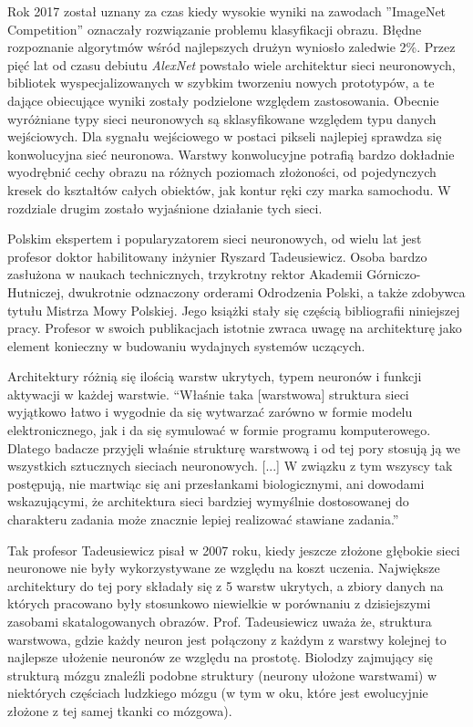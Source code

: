 \documentclass[12pt,a4paper,twoside,titlepage,openright]{book}
\begin{document}
Rok 2017 został uznany za czas kiedy wysokie wyniki na zawodach ''ImageNet Competition'' oznaczały rozwiązanie problemu klasyfikacji obrazu. Błędne rozpoznanie algorytmów wśród najlepszych drużyn wyniosło zaledwie 2\%. Przez pięć lat od czasu debiutu \textit{AlexNet} powstało wiele architektur sieci neuronowych, bibliotek wyspecjalizowanych w szybkim tworzeniu nowych prototypów, a te dające obiecujące wyniki zostały podzielone względem zastosowania. Obecnie wyróżniane typy sieci neuronowych są sklasyfikowane względem typu danych wejściowych. Dla sygnału wejściowego w postaci pikseli najlepiej sprawdza się konwolucyjna sieć neuronowa. Warstwy konwolucyjne potrafią bardzo dokładnie wyodrębnić cechy obrazu na różnych poziomach złożoności, od pojedynczych kresek do kształtów całych obiektów, jak kontur ręki czy marka samochodu. W rozdziale drugim zostało wyjaśnione działanie tych sieci.

Polskim ekspertem i popularyzatorem sieci neuronowych, od wielu lat jest profesor doktor habilitowany inżynier Ryszard Tadeusiewicz. Osoba bardzo zasłużona w naukach technicznych, trzykrotny rektor Akademii Górniczo-Hutniczej, dwukrotnie odznaczony orderami Odrodzenia Polski, a także zdobywca tytułu Mistrza Mowy Polskiej. Jego książki stały się częścią bibliografii niniejszej pracy. Profesor w swoich publikacjach istotnie zwraca uwagę na architekturę jako element konieczny w budowaniu wydajnych systemów uczących.

Architektury różnią się ilością warstw ukrytych, typem neuronów i funkcji aktywacji w każdej warstwie.
“Właśnie taka [warstwowa] struktura sieci wyjątkowo łatwo i wygodnie da się wytwarzać zarówno w formie modelu elektronicznego, jak i da się symulować w formie programu komputerowego. Dlatego badacze przyjęli właśnie strukturę warstwową i od tej pory stosują ją we wszystkich sztucznych sieciach neuronowych. [...] W związku z tym wszyscy tak postępują, nie martwiąc się ani przesłankami biologicznymi, ani dowodami wskazującymi, że architektura sieci bardziej wymyślnie dostosowanej do charakteru zadania może znacznie lepiej realizować stawiane zadania.”

Tak profesor Tadeusiewicz pisał w 2007 roku, kiedy jeszcze złożone głębokie sieci neuronowe nie były wykorzystywane ze względu na koszt uczenia. Największe architektury do tej pory składały się z 5 warstw ukrytych, a zbiory danych na których pracowano były stosunkowo niewielkie w porównaniu z dzisiejszymi zasobami skatalogowanych obrazów. Prof. Tadeusiewicz uważa że, struktura warstwowa, gdzie każdy neuron jest połączony z każdym z warstwy kolejnej to najlepsze ułożenie neuronów ze względu na prostotę. Biolodzy zajmujący się strukturą mózgu znaleźli podobne struktury (neurony ułożone warstwami) w niektórych częściach ludzkiego mózgu (w tym w oku, które jest ewolucyjnie złożone z tej samej tkanki co mózgowa).
\end{document}
